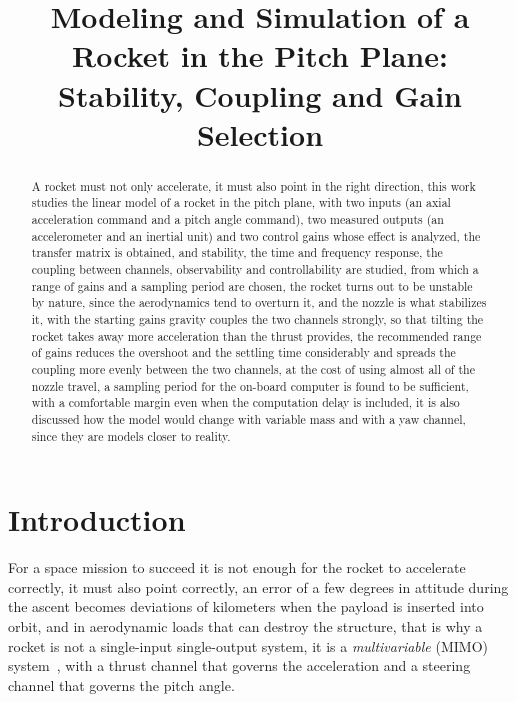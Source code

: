 \documentclass[article, 11pt]{IEEEtran}   %
\begin{document}
\title{Modeling and Simulation of a Rocket in the Pitch Plane:\\ Stability, Coupling and Gain Selection}

\author{
}

\maketitle

\begin{abstract}
A rocket must not only accelerate, it must also point in the right direction, this work studies the linear model of a rocket in the pitch plane, with two inputs (an axial acceleration command and a pitch angle command), two measured outputs (an accelerometer and an inertial unit) and two control gains whose effect is analyzed, the transfer matrix is obtained, and stability, the time and frequency response, the coupling between channels, observability and controllability are studied, from which a range of gains and a sampling period are chosen, the rocket turns out to be unstable by nature, since the aerodynamics tend to overturn it, and the nozzle is what stabilizes it, with the starting gains gravity couples the two channels strongly, so that tilting the rocket takes away more acceleration than the thrust provides, the recommended range of gains reduces the overshoot and the settling time considerably and spreads the coupling more evenly between the two channels, at the cost of using almost all of the nozzle travel, a sampling period for the on-board computer is found to be sufficient, with a comfortable margin even when the computation delay is included, it is also discussed how the model would change with variable mass and with a yaw channel, since they are models closer to reality.
\end{abstract}

\section{Introduction}
For a space mission to succeed it is not enough for the rocket to accelerate correctly, it must also point correctly, an error of a few degrees in attitude during the ascent becomes deviations of kilometers when the payload is inserted into orbit, and in aerodynamic loads that can destroy the structure, that is why a rocket is not a single-input single-output system, it is a \emph{multivariable} (MIMO) system~\cite{skogestad}, with a thrust channel that governs the acceleration and a steering channel that governs the pitch angle.
\end{document}
